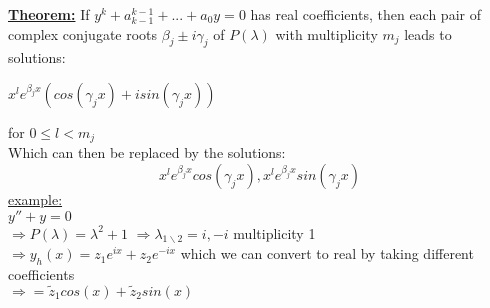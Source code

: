 \documentclass[8pt]{extreport}
\begin{document}
\underline{\textbf{Theorem:}} If $y^k + a_{k-1}^{k-1} + ... + a_0y = 0$ has real coefficients, then each pair of complex conjugate roots $\beta_j \pm i \gamma_j$ of $P(\lambda)$ with multiplicity $m_j$ leads to solutions:
\begin{center}
$x^le^{\beta_j x}(cos(\gamma_jx) + i sin(\gamma_j x))$
\end{center}
for $0 \leq l < m_j$ \\
Which can then be replaced by the solutions:
$$ x^le^{\beta_jx}cos(\gamma_jx),x^le^{\beta_jx}sin(\gamma_jx)$$
\underline{example:}\\
$y'' + y = 0$\\
$\Rightarrow P(\lambda) = \lambda^2 +1$
$\Rightarrow \lambda_{1\backslash 2} = i, -i$ multiplicity 1 \\
$\Rightarrow y_h(x) = z_1e^{ix} + z_2 e^{-ix}$ which we can convert to real by taking different coefficients\\
$\Rightarrow = \tilde{z}_1cos(x) + \tilde{z}_2sin(x)$
\end{document}
